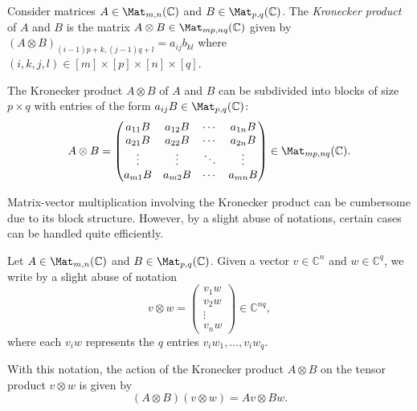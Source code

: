 \documentclass[a4paper,oneside, 12pt]{amsart}
\begin{document}
\begin{definition}\label{def:kronecker-product}
  Consider matrices \(A \in \Mat_{m,n}( \mathbb{C})\) and \(B \in \Mat_{p,q}( \mathbb{C})\).
  The \emph{Kronecker product} of \(A\) and \(B\)
  is the matrix \(A\otimes B \in \Mat_{mp,nq} ( \mathbb{C})\) given by
  \((A\otimes B)_{(i-1)p+k,(j-1)q+l}= a_{ij}b_{kl}\) where \((i,k,j,l)\in[m]\times[p]\times[n]\times[q]\).
\end{definition}
The Kronecker product \(A\otimes B\) of \(A\) and \(B\)  can be subdivided into blocks of size \(p\times q\) with entries of the  form \(a_{ij}B \in \Mat_{p,q}( \mathbb{C})\):
\begin{equation}
  A \otimes B = \begin{pmatrix}
    a_{11}B & a_{12}B & \cdots & a_{1n}B \\
    a_{21}B & a_{22}B & \cdots & a_{2n}B \\
    \vdots  & \vdots  & \ddots & \vdots  \\
    a_{m1}B & a_{m2}B & \cdots & a_{mn}B
  \end{pmatrix} \in \Mat_{mp,nq}(\mathbb{C}).
\end{equation}

Matrix-vector multiplication involving the Kronecker product can be cumbersome due to its block structure.
However, by a slight abuse of notations, certain cases can be handled quite efficiently.
\begin{remark}\label{rmk:matrix-vector-multiplication-Kronecker-product}
  Let \(A\in \Mat_{m,n}( \mathbb{C})\) and \(B \in \Mat_{p,q}( \mathbb{C})\).
  Given a vector \(v\in \mathbb{C}^{n}\) and \(w \in \mathbb{C}^{q}\), we write by a slight abuse of notation
  \begin{equation}
    v\otimes w =
    \begin{pmatrix}
      v_{1} w\\
      v_{2} w\\
      \vdots \\
      v_{n} w
    \end{pmatrix} \in \mathbb{C}^{nq},
  \end{equation}
  where each \( v_i w \) represents the \(q\) entries \(v_{i}w_{1}, \dots , v_{i}w_{q}\).

  With this notation, the action of the Kronecker product \(A\otimes B\) on the tensor product \(v\otimes w\) is given by
  \begin{equation*}
    (A\otimes B) (v\otimes w) = Av \otimes Bw.
  \end{equation*}
\end{remark}
\end{document}

